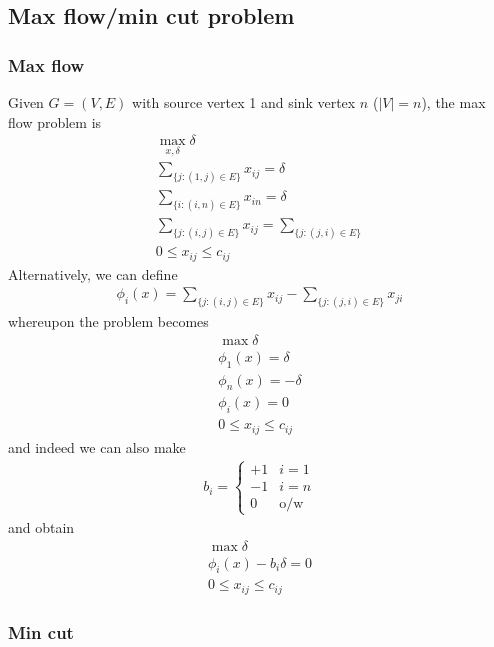 \documentclass{../../template/note}
\begin{document}
    \subsection{Max flow/min cut problem}

    \subsubsection{Max flow}

    Given $G = (V, E)$ with source vertex 1 and sink vertex $n$ ($|V| = n$), the max flow problem is
    \begin{align*}
        \max_{x, \delta} \delta \\
        \sum_{\{j: (1, j) \in E\}} x_{ij} = \delta \\
        \sum_{\{i: (i, n) \in E\}} x_{in} = \delta \\
        \sum_{\{j: (i, j) \in E\}} x_{ij} = \sum_{\{j: (j, i) \in E\}} \\
        0 \leq x_{ij} \leq c_{ij}
    \end{align*}
    Alternatively, we can define
    \begin{align*}
        \phi_i(x) = \sum_{\{j: (i, j) \in E\}} x_{ij} - \sum_{\{j: (j, i) \in E\}} x_{ji}
    \end{align*}
    whereupon the problem becomes
    \begin{align*}
        \max \delta \\
        \phi_1(x) = \delta \\
        \phi_n(x) = -\delta \\
        \phi_i(x) = 0 \\
        0 \leq x_{ij} \leq c_{ij}
    \end{align*}
    and indeed we can also make
    \begin{align*}
        b_i = \begin{cases}
            +1 & i=1 \\
            -1 & i=n \\
            0 & \text{o/w}
        \end{cases}
    \end{align*}
    and obtain
    \begin{align*}
        \max \delta \\
        \phi_i(x) - b_i\delta = 0 \\
        0 \leq x_{ij} \leq c_{ij}
    \end{align*}
    
    \subsubsection{Min cut}
\end{document}
